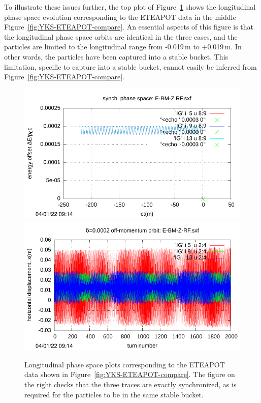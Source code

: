 \documentclass[12]{article}
\begin{document}
To illustrate these issues further, the top plot of 
Figure~\ref{fig:RK-compare-longit}
shows the longitudinal phase space evolution corresponding 
to the ETEAPOT data in the middle 
Figure~\ref{fig:YKS-ETEAPOT-compare}. An essential aspects of
this figure is that the longitudinal phase space orbits are identical
in the three cases, and the particles are limited to the longitudinal
range from -0.019\,m to +0.019\,m. In other words, the particles have
been captured into a stable bucket. This limitation, specific to capture
into a stable bucket, cannot easily be inferred from 
Figure~\ref{fig:YKS-ETEAPOT-compare}. 

\begin{figure}[h]
\centering
\includegraphics[scale=0.6]{pdf/BM-IV_Figure6l.pdf}
\includegraphics[scale=0.6]{pdf/BM-IV_Figure6r.pdf}
\caption{\label{fig:RK-compare-longit}Longitudinal phase 
space plots corresponding to the ETEAPOT data shown
in Figure~\ref{fig:YKS-ETEAPOT-compare}. The figure
on the right checks that the three traces are exactly
synchronized, as is required for the particles to be in
the same stable bucket.}
\end{figure}
\end{document}

